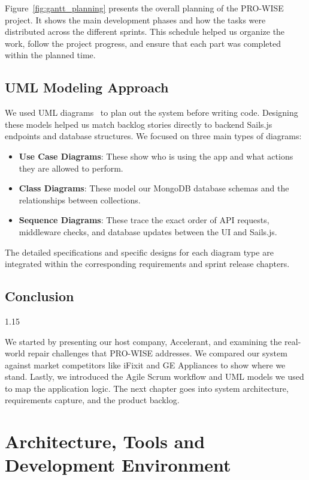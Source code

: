 \documentclass[12pt,a4paper]{report}
\begin{document}
Figure~\ref{fig:gantt_planning} presents the overall planning of the PRO-WISE project. It shows the main development phases and how the tasks were distributed across the different sprints. This schedule helped us organize the work, follow the project progress, and ensure that each part was completed within the planned time.

\section{UML Modeling Approach}

We used UML diagrams~\cite{umlguide} to plan out the system before writing code. Designing these models helped us match backlog stories directly to backend Sails.js endpoints and database structures. We focused on three main types of diagrams:
\begin{itemize}
    \item \textbf{Use Case Diagrams}: These show who is using the app and what actions they are allowed to perform.
    \item \textbf{Class Diagrams}: These model our MongoDB database schemas and the relationships between collections.
    \item \textbf{Sequence Diagrams}: These trace the exact order of API requests, middleware checks, and database updates between the UI and Sails.js.
\end{itemize}
The detailed specifications and specific designs for each diagram type are integrated within the corresponding requirements and sprint release chapters.

\section{Conclusion}
\begin{spacing}{1.15}
\setlength{\parskip}{2pt}

We started by presenting our host company, Accelerant, and examining the real-world repair challenges that PRO-WISE addresses. We compared our system against market competitors like iFixit and GE Appliances to show where we stand. Lastly, we introduced the Agile Scrum workflow and UML models we used to map the application logic. The next chapter goes into system architecture, requirements capture, and the product backlog.

\end{spacing}

\chapter{Architecture, Tools and Development Environment}
\end{document}
